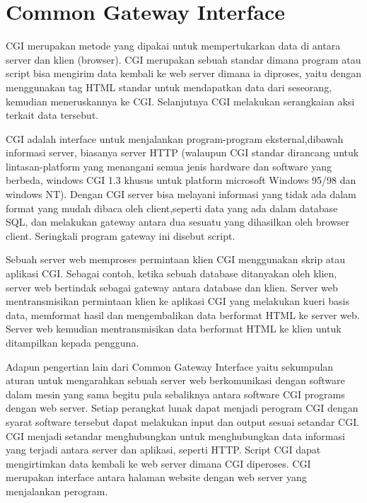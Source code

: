
\section{Common Gateway Interface}
CGI merupakan metode yang dipakai untuk mempertukarkan data di antara server dan klien (browser). CGI merupakan sebuah standar dimana program atau script bisa mengirim data kembali ke web server dimana ia diproses, yaitu dengan menggunakan tag HTML standar untuk mendapatkan data dari seseorang, kemudian meneruskannya ke CGI. Selanjutnya CGI melakukan serangkaian aksi terkait data tersebut\cite{prihatmoko2013pengembangan}.

\par CGI adalah interface untuk menjalankan program-program eksternal,dibawah informasi server, biasanya server HTTP (walaupun CGI standar dirancang untuk lintasan-platform yang
menangani semua jenis hardware dan software yang berbeda, windows CGI 1.3 khusus untuk platform microsoft Windows 95/98 dan windows NT). Dengan CGI server bisa
melayani informasi yang tidak ada dalam format yang mudah dibaca oleh client,seperti data yang ada dalam database SQL, dan melakukan gateway antara dua sesuatu yang 
dihasilkan oleh browser client. Seringkali program gateway ini disebut script.

\par Sebuah server web memproses permintaan klien CGI menggunakan skrip atau aplikasi CGI. Sebagai contoh, ketika sebuah database ditanyakan oleh klien, 
server web bertindak sebagai gateway antara database dan klien. Server web mentransmisikan permintaan klien ke aplikasi CGI yang melakukan kueri basis data,
 memformat hasil dan mengembalikan data berformat HTML ke server web. Server web kemudian mentransmisikan data berformat HTML ke klien untuk ditampilkan kepada pengguna.


\par Adapun pengertian lain dari Common Gateway Interface yaitu sekumpulan aturan untuk mengarahkan sebuah server web berkomunikasi dengan software dalam mesin yang sama begitu pula sebaliknya antara software CGI programs dengan web server. Setiap perangkat lunak dapat menjadi perogram CGI dengan syarat software tersebut dapat melakukan input dan output sesuai setandar CGI. CGI menjadi setandar menghubungkan untuk menghubungkan data informasi yang terjadi antara server dan aplikasi, seperti HTTP. Script CGI dapat mengirtimkan data kembali ke web server  dimana CGI diperoses. CGI merupakan interface antara halaman website dengan web server yang menjalankan perogram\cite{aditya2015analisis}.


